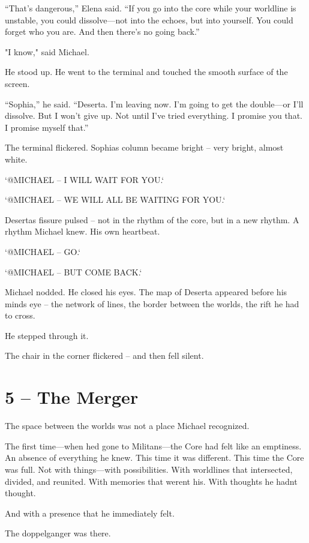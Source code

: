 \documentclass[
]{article}
\begin{document}
``That's dangerous,'' Elena said. ``If you go into the core while your worldline is unstable, you could dissolve---not into the echoes, but into yourself. You could forget who you are. And then there's no going back.''

"I know," said Michael.

He stood up. He went to the terminal and touched the smooth surface of the screen.

``Sophia,'' he said. ``Deserta. I'm leaving now. I'm going to get the double---or I'll dissolve. But I won't give up. Not until I've tried everything. I promise you that. I promise myself that.''

The terminal flickered. Sophia\textquotesingle s column became bright -- very bright, almost white.

`@MICHAEL -- I WILL WAIT FOR YOU.`

`@MICHAEL -- WE WILL ALL BE WAITING FOR YOU.`

Deserta\textquotesingle s fissure pulsed -- not in the rhythm of the core, but in a new rhythm. A rhythm Michael knew. His own heartbeat.

`@MICHAEL -- GO.`

`@MICHAEL -- BUT COME BACK.`

Michael nodded. He closed his eyes. The map of Deserta appeared before his mind\textquotesingle s eye -- the network of lines, the border between the worlds, the rift he had to cross.

He stepped through it.

The chair in the corner flickered -- and then fell silent.

\section{5 -- The Merger}\label{the-merger}

The space between the worlds was not a place Michael recognized.

The first time---when he\textquotesingle d gone to Militans---the Core had felt like an emptiness. An absence of everything he knew. This time it was different. This time the Core was full. Not with things---with possibilities. With worldlines that intersected, divided, and reunited. With memories that weren\textquotesingle t his. With thoughts he hadn\textquotesingle t thought.

And with a presence that he immediately felt.

The doppelganger was there.
\end{document}
